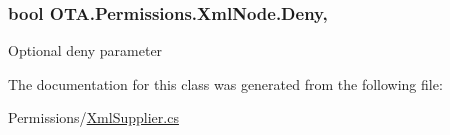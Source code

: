 \subsubsection[{Deny}]{\setlength{\rightskip}{0pt plus 5cm}bool O\+T\+A.\+Permissions.\+Xml\+Node.\+Deny\hspace{0.3cm}{\ttfamily [get]}, {\ttfamily [set]}}\label{class_o_t_a_1_1_permissions_1_1_xml_node_a16fdfe01ca86f0e60b599e6f986c4559}


Optional deny parameter 



The documentation for this class was generated from the following file\+:\begin{DoxyCompactItemize}
\item 
Permissions/\hyperlink{_xml_supplier_8cs}{Xml\+Supplier.\+cs}\end{DoxyCompactItemize}
